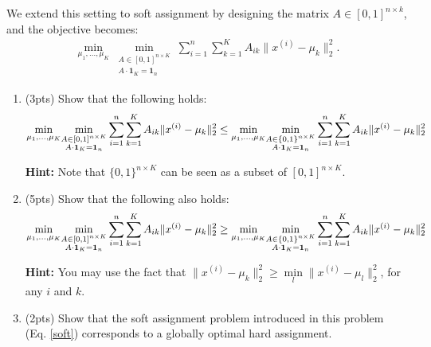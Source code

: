 \documentclass[12pt]{article}
\begin{document}
We extend this setting to soft assignment by designing the matrix $A \in [0,1]^{n\times k}$, and the objective becomes:
\begin{align}
    \label{soft}
    \underset{\mu_1, ..., \mu_K}{\min}\underset{\substack{A \in [0,1]^{n\times K} \\ A\cdot\mathbf{1}_K= \mathbf{1}_n}}{\min}\sum_{i=1}^n\sum_{k=1}^K A_{ik}\|x^{(i)} - \mu_k\|^2_2. 
\end{align}

\begin{enumerate}
    \item (3pts) Show that the following holds:
    \begin{align}
        \underset{\mu_1, ..., \mu_K}{\min}\underset{\substack{A \in [0,1]^{n\times K} \\ A\cdot\mathbf{1}_K= \mathbf{1}_n}}{\min}\sum_{i=1}^n\sum_{k=1}^K A_{ik}\|x^{(i)} - \mu_k\|^2_2 \leq \underset{\mu_1, ..., \mu_K}{\min}\underset{\substack{A \in \{0,1\}^{n\times K} \\ A\cdot\mathbf{1}_K= \mathbf{1}_n}}{\min}\sum_{i=1}^n\sum_{k=1}^K A_{ik}\|x^{(i)} - \mu_k\|^2_2\notag
    \end{align}
    
    \textbf{Hint:} Note that $\{0,1\}^{n\times K}$ can be seen as a subset of $[0,1]^{n\times K}$.

    \item (5pts) Show that the following also holds:
    \begin{align}
        \underset{\mu_1, ..., \mu_K}{\min}\underset{\substack{A \in [0,1]^{n\times K} \\ A\cdot\mathbf{1}_K= \mathbf{1}_n}}{\min}\sum_{i=1}^n\sum_{k=1}^K A_{ik}\|x^{(i)} - \mu_k\|^2_2 \geq \underset{\mu_1, ..., \mu_K}{\min}\underset{\substack{A \in \{0,1\}^{n\times K} \\ A\cdot\mathbf{1}_K= \mathbf{1}_n}}{\min}\sum_{i=1}^n\sum_{k=1}^K A_{ik}\|x^{(i)} - \mu_k\|^2_2\notag
    \end{align}
    
    \textbf{Hint:} You may use the fact that $\|x^{(i)} - \mu_k\|^2_2 \geq \underset{l}{\min}\|x^{(i)} - \mu_l\|^2_2$, for any $i$ and $k$.

    \item (2pts) Show that the soft assignment problem introduced in this problem (Eq. \ref{soft}) corresponds to a globally optimal hard assignment.
    
\end{enumerate}
\end{document}
